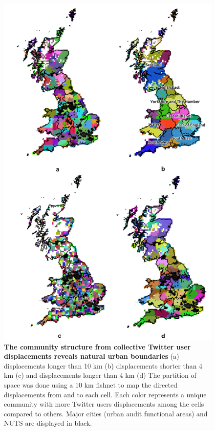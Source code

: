 \documentclass[10pt,letterpaper]{article}
\begin{document}
\begin{figure}[ht]
\includegraphics[width=0.9\linewidth]{./figure/PNG/S5_community}
\caption{{\bf The community structure from collective Twitter user displacements reveals natural urban boundaries} (a) displacements longer than 10 km (b) displacements shorter than 4 km (c) and displacements longer than 4 km (d) The partition of space was done using a 10 km fishnet to map the directed displacements from and to each cell. Each color represents a unique community with more Twitter users displacements among the cells compared to others. Major cities (urban audit functional areas) and NUTS are displayed in black.}
\label{S5_Fig}
\end{figure}
\end{document}
